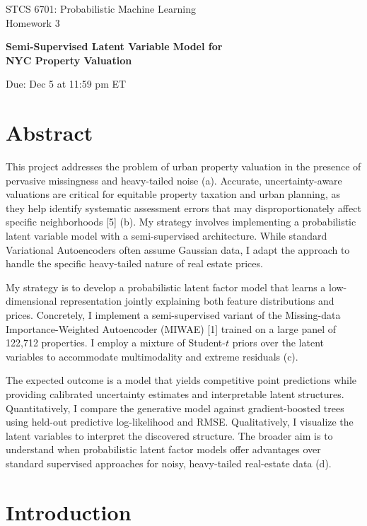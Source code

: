\documentclass[11pt]{article}
\begin{document}
\begin{center}
{\Large STCS 6701: Probabilistic Machine Learning\\
Homework 3}

\vspace{0.5em}
{\LARGE \textbf{Semi-Supervised Latent Variable Model for\\ NYC Property Valuation}}

\vspace{1em}

Due: Dec 5 at 11:59 pm ET
\end{center}

\section*{Abstract}

This project addresses the problem of urban property valuation in the presence of pervasive missingness and heavy-tailed noise (a). Accurate, uncertainty-aware valuations are critical for equitable property taxation and urban planning, as they help identify systematic assessment errors that may disproportionately affect specific neighborhoods [5] (b). My strategy involves implementing a probabilistic latent variable model with a semi-supervised architecture. While standard Variational Autoencoders often assume Gaussian data, I adapt the approach to handle the specific heavy-tailed nature of real estate prices.

My strategy is to develop a probabilistic latent factor model that learns a low-dimensional representation jointly explaining both feature distributions and prices. Concretely, I implement a semi-supervised variant of the Missing-data Importance-Weighted Autoencoder (MIWAE) [1] trained on a large panel of 122,712 properties. I employ a mixture of Student-$t$ priors over the latent variables to accommodate multimodality and extreme residuals (c).

The expected outcome is a model that yields competitive point predictions while providing calibrated uncertainty estimates and interpretable latent structures. Quantitatively, I compare the generative model against gradient-boosted trees using held-out predictive log-likelihood and RMSE. Qualitatively, I visualize the latent variables to interpret the discovered structure. The broader aim is to understand when probabilistic latent factor models offer advantages over standard supervised approaches for noisy, heavy-tailed real-estate data (d).

\section*{Introduction}
\end{document}
